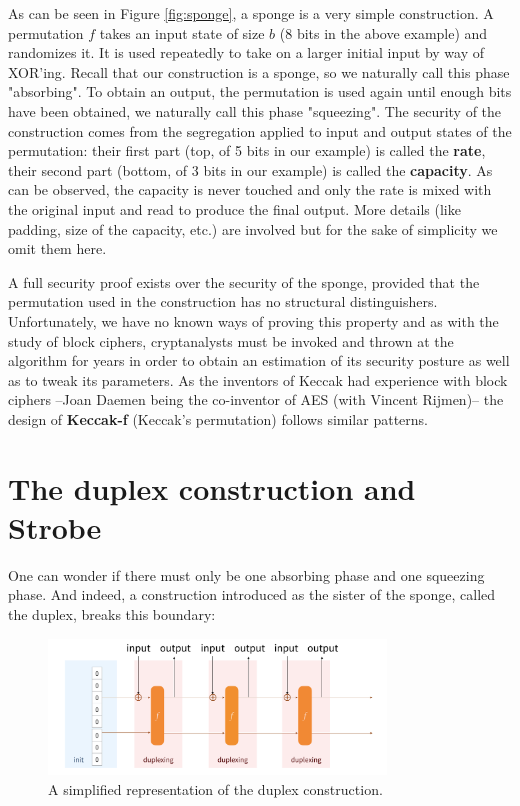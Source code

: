 \documentclass{article}
\begin{document}
As can be seen in Figure \ref{fig:sponge}, a sponge is a very simple construction. A permutation $f$ takes an input state of size $b$ (8 bits in the above example) and randomizes it. It is used repeatedly to take on a larger initial input by way of XOR'ing. Recall that our construction is a sponge, so we naturally call this phase  "absorbing". To obtain an output, the permutation is used again until enough bits have been obtained, we naturally call this phase "squeezing". The security of the construction comes from the segregation applied to input and output states of the permutation: their first part (top, of 5 bits in our example) is called the \textbf{rate}, their second part (bottom, of 3 bits in our example) is called the \textbf{capacity}. As can be observed, the capacity is never touched and only the rate is mixed with the original input and read to produce the final output. More details (like padding, size of the capacity, etc.) are involved but for the sake of simplicity we omit them here.

A full security proof exists over the security of the sponge, provided that the permutation used in the construction has no structural distinguishers. Unfortunately, we have no known ways of proving this property and as with the study of block ciphers, cryptanalysts must be invoked and thrown at the algorithm for years in order to obtain an estimation of its security posture as well as to tweak its parameters. As the inventors of Keccak had experience with block ciphers --Joan Daemen being the co-inventor of AES (with Vincent Rijmen)-- the design of \textbf{Keccak-f} (Keccak's permutation) follows similar patterns.

\section{The duplex construction and Strobe}

One can wonder if there must only be one absorbing phase and one squeezing phase. And indeed, a construction introduced as the sister of the sponge, called the duplex, breaks this boundary:

\begin{figure}[H]
\centering
\includegraphics[width=0.8\textwidth]{rwcimg/duplex.png}
\caption{A simplified representation of the duplex construction.}
\end{figure}
\end{document}
